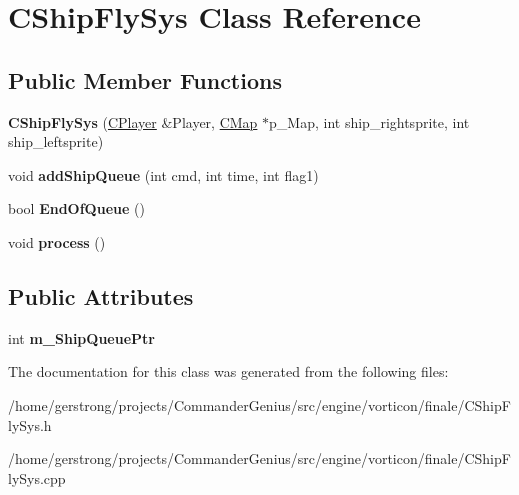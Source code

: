 \hypertarget{class_c_ship_fly_sys}{
\section{CShipFlySys Class Reference}
\label{class_c_ship_fly_sys}
}
\subsection*{Public Member Functions}
\begin{DoxyCompactItemize}
\item 
\hypertarget{class_c_ship_fly_sys_a82437a480261e718018af5956a59ecc9}{
{\bfseries CShipFlySys} (\hyperlink{class_c_player}{CPlayer} \&Player, \hyperlink{class_c_map}{CMap} $\ast$p\_\-Map, int ship\_\-rightsprite, int ship\_\-leftsprite)}
\label{class_c_ship_fly_sys_a82437a480261e718018af5956a59ecc9}

\item 
\hypertarget{class_c_ship_fly_sys_a10ef8e223c7ec12a9acb3e5767e6eaf0}{
void {\bfseries addShipQueue} (int cmd, int time, int flag1)}
\label{class_c_ship_fly_sys_a10ef8e223c7ec12a9acb3e5767e6eaf0}

\item 
\hypertarget{class_c_ship_fly_sys_ad806bcbb18a22738ca02d0a0a3d70080}{
bool {\bfseries EndOfQueue} ()}
\label{class_c_ship_fly_sys_ad806bcbb18a22738ca02d0a0a3d70080}

\item 
\hypertarget{class_c_ship_fly_sys_a99529afd3a919946bb48fdbbcb15b53a}{
void {\bfseries process} ()}
\label{class_c_ship_fly_sys_a99529afd3a919946bb48fdbbcb15b53a}

\end{DoxyCompactItemize}
\subsection*{Public Attributes}
\begin{DoxyCompactItemize}
\item 
\hypertarget{class_c_ship_fly_sys_a6d6692ff04a9fa71b7de1f4c654aeb49}{
int {\bfseries m\_\-ShipQueuePtr}}
\label{class_c_ship_fly_sys_a6d6692ff04a9fa71b7de1f4c654aeb49}

\end{DoxyCompactItemize}


The documentation for this class was generated from the following files:\begin{DoxyCompactItemize}
\item 
/home/gerstrong/projects/CommanderGenius/src/engine/vorticon/finale/CShipFlySys.h\item 
/home/gerstrong/projects/CommanderGenius/src/engine/vorticon/finale/CShipFlySys.cpp\end{DoxyCompactItemize}
